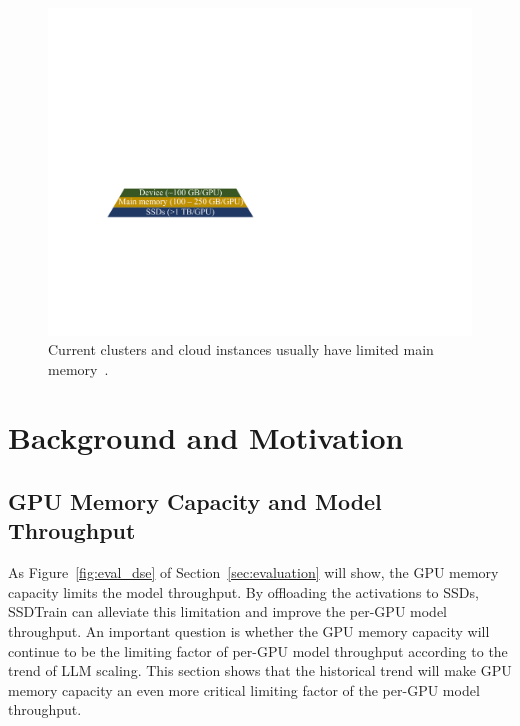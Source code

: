 
\begin{figure}[!tb]
\centering
\includegraphics[width=0.6\linewidth]{figures/SSDTrain/current_sys_parta_recolored.pdf}
\caption{\label{fig:current_sys} Current clusters and cloud instances usually have limited main memory~\cite{microsoftNDA100V4series2024,googleGPUMachineTypes,ncsaDeltaProjectProfile}.}
\end{figure}

\section{Background and Motivation}

\subsection{GPU Memory Capacity and Model Throughput}
\label{sec:llm_scaling}
As Figure~\ref{fig:eval_dse} of Section~\ref{sec:evaluation} will show, the GPU memory capacity limits the model throughput. By offloading the activations to SSDs, SSDTrain can alleviate this limitation and improve the per-GPU model throughput. An important question is whether the GPU memory capacity will continue to be the limiting factor of per-GPU model throughput according to the trend of LLM scaling. This section shows that the historical trend will make GPU memory capacity an even more critical limiting factor of the per-GPU model throughput.

